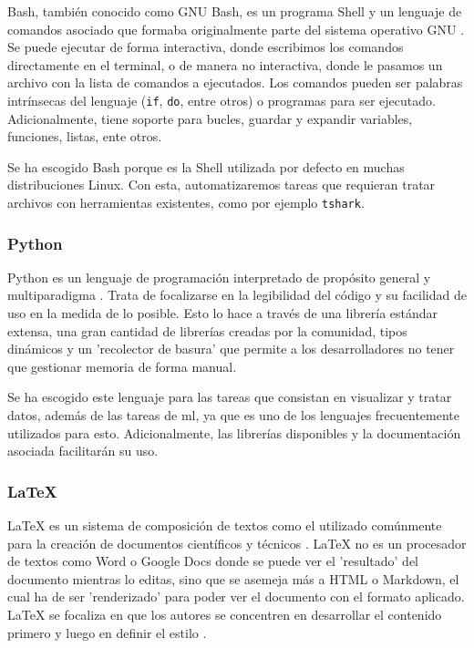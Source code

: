 Bash, también conocido como GNU Bash, es un programa Shell y un lenguaje de comandos asociado que formaba originalmente parte del sistema operativo GNU \cite{gnubashweb} \cite{gnubashmanual}. Se puede ejecutar de forma interactiva, donde escribimos los comandos directamente en el terminal, o de manera no interactiva, donde le pasamos un archivo con la lista de comandos a ejecutados. Los comandos pueden ser palabras intrínsecas del lenguaje (\texttt{if}, \texttt{do}, entre otros) o programas para ser ejecutado. Adicionalmente, tiene soporte para bucles, guardar y expandir variables, funciones, listas, ente otros.

Se ha escogido Bash porque es la Shell utilizada por defecto en muchas distribuciones Linux. Con esta, automatizaremos tareas que requieran tratar archivos con herramientas existentes, como por ejemplo \texttt{tshark}.

\subsubsection{Python}

Python es un lenguaje de programación interpretado de propósito general y multiparadigma \cite{aboutpython} \cite{davepython}. Trata de focalizarse en la legibilidad del código y su facilidad de uso en la medida de lo posible. Esto lo hace a través de una librería estándar extensa, una gran cantidad de librerías creadas por la comunidad, tipos dinámicos y un 'recolector de basura' que permite a los desarrolladores no tener que gestionar memoria de forma manual.

Se ha escogido este lenguaje para las tareas que consistan en visualizar y tratar datos, además de las tareas de \gls{ml}, ya que es uno de los lenguajes frecuentemente utilizados para esto. Adicionalmente, las librerías disponibles y la documentación asociada facilitarán su uso.

\subsubsection{LaTeX}

LaTeX es un sistema de composición de textos como el utilizado comúnmente para la creación de documentos científicos y técnicos \cite{latexweb}. LaTeX no es un procesador de textos como Word o Google Docs donde se puede ver el 'resultado' del documento mientras lo editas, sino que se asemeja más a HTML o Markdown, el cual ha de ser 'renderizado' para poder ver el documento con el formato aplicado. LaTeX se focaliza en que los autores se concentren en desarrollar el contenido primero y luego en definir el estilo \cite{latexabout}.

